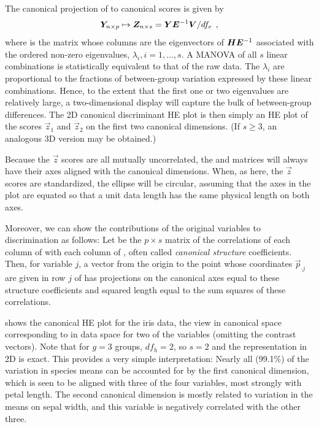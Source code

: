 The canonical projection of   to canonical scores  is given by
\begin{equation}
\bm{Y}_{n \times p} \mapsto \bm{Z}_{n \times s} = \bm{Y} \bm{\bm{E}}^{-1} \bm{V} / df_e \:\: ,
\end{equation}
where  is the matrix whose columns are the eigenvectors of $\bm{H} \bm{\bm{E}}^{-1}$
associated with the ordered non-zero eigenvalues, \(\lambda_i, i=1,\dots, s\).
A MANOVA of all $s$ linear combinations is statistically
equivalent to that of the raw data.
The \(\lambda_i\)
are proportional to the fractions of between-group variation
expressed by these linear combinations.
Hence, to the extent that the first one or two
eigenvalues are relatively large, a two-dimensional display will
capture the bulk of between-group differences. The 2D canonical
discriminant HE plot is then simply an HE plot of the scores
$\vec{z}_1$ and $\vec{z}_2$ on the first two canonical dimensions.
(If $s\ge3$, an analogous 3D version may be obtained.)

Because the $\vec{z}$ scores are all mutually uncorrelated, the  and
 matrices will always have their axes aligned with the
canonical dimensions. When, as here, the $\vec{z}$ scores are
standardized, the  ellipse will be circular, assuming that
the axes in the plot are equated so that a unit data length has the same
physical length on both axes.

Moreover, we can show the contributions of the original variables to discrimination
as follows:  Let  be the $p \times s$ matrix of the correlations of
each column of  with each column of , often called
\emph{canonical structure} coefficients.
Then, for variable $j$, a
vector from the origin
to the point whose coordinates $\vec{p}_{\cdot j}$ are given in row $j$ of 
has projections on the canonical axes equal to these structure coefficients
and squared length equal to the sum squares of these correlations.

 shows the canonical HE plot for the iris data, the
view in canonical space corresponding to  in data space
for two of the variables (omitting the contrast vectors).
Note that for $g=3$ groups, $df_h=2$, so $s=2$ and the representation in 2D is exact.
This provides a very simple interpretation:  Nearly all (99.1\%)
of the variation in species means can be accounted for by the first canonical dimension,
which is seen to be aligned with three of the four variables, most strongly with
petal length.  The second canonical dimension is mostly related to variation in the
means on sepal width, and this variable is negatively correlated with the
other three.

